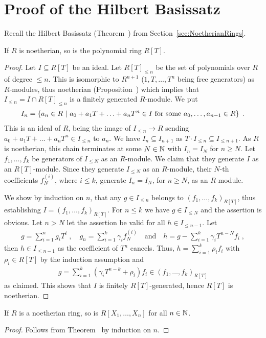 \documentclass[a4paper,parskip=half,numbers=enddot, DIV=12]{scrreprt}
\renewcommand{\geq}{\geqslant}
\renewcommand{\leq}{\leqslant}
\begin{document}
\section{Proof of the Hilbert Basissatz}
	Recall the Hilbert Basissatz (Theorem~) from Section~\ref{sec:NoetherianRings}.
	\setcounter{thm}{0}
	\begin{thm}
		If $R$ is noetherian, so is the polynomial ring $R[T]$.
	\end{thm}
	\begin{proof}
		Let $I\subseteq R[T]$ be an ideal. Let $R[T]_{\leq n}$ be the set of polynomials over $R$ of degree $\leq n$. This is isomorphic to $R^{n+1}$ ($1,T,\ldots, T^n$ being free generators) as $R$-modules, thus noetherian (Proposition~) which implies that $I_{\leq n} = I \cap R[T]_{\leq n}$ is a finitely generated $R$-module. 
		We put 
		\begin{align*}
			I_n=\left\{a_n\in R\ \middle|\  a_0+a_1T+\ldots+a_nT^n\in I\text{ for some }a_0,\ldots,a_{n-1}\in R\right\}\;.
		\end{align*}
		This is an ideal of $R$, being the image of $I_{\leq n} \to R$ sending $a_0+a_1T+\ldots+a_nT^n\in I_{\leq n}$ to $a_n$. We have $I_n\subseteq I_{n+1}$ as $T\cdot I_{\leq n}\subseteq I_{\leq n+1}$. As $R$ is noetherian, this chain terminates at some $N\in\mathbb{N}$ with $I_n = I_N$ for $n\geq N$. Let $f_1,\ldots, f_k$ be generators of $I_{\leq N}$ as an $R$-module. We claim that they generate $I$ as an $R[T]$-module. Since they generate $I_{\leq N}$ as an $R$-module, their $N$-th coefficients $f_N^{(i)}$, where $i\leq k$, generate $I_n = I_N$, for $n\geq N$, as an $R$-module.
		
		We show by induction on $n$, that any $g\in I_{\leq n}$ belongs to $\left(f_1,\ldots,f_k\right)_{R[T]}$, thus establishing $I= \left(f_1,\ldots, f_k\right)_{R[T]}$. For $n\leq k$ we have $g\in I_{\leq N}$ and the assertion is obvious. Let $n>N$ let the assertion be valid for all $h \in I_{\leq n-1}$. Let 
		\begin{align*}
			g=\sum_{i=1}^n g_iT^i\;,\quad g_n = \sum_{i=1}^k \gamma_i f_N^{(i)}\quad\text{and}\quad h = g-\sum_{i=1}^k\gamma_i T^{n-N} f_i\;,
		\end{align*}
		then $h\in I_{\leq n-1}$ as the coefficient of $T^n$ cancels. Thus, $h = \sum_{i=1}^k\rho_i f_i$ with $\rho_i\in R[T]$ by the induction assumption and
		\begin{align*}
		g=\sum_{i=1}^k(\gamma_i T^{n-k} +\rho_i) f_i \in \left( f_1,\ldots,f_k\right)_{R[T]}
		\end{align*}
		as claimed. This shows that $I$ is finitely $R[T]$-generated, hence $R[T]$ is noetherian.
	\end{proof}
	\begin{cor}
		If $R$ is a noetherian ring, so is $R[X_1,\ldots,X_n]$ for all $n\in\mathbb{N}$.
	\end{cor}
	\begin{proof}
		Follows from Theorem~ by induction on $n$.
	\end{proof}
\setcounter{thm}{2}
\end{document}
